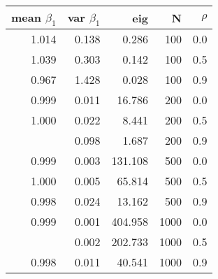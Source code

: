 
\begin{tabular}{rrrrr}
\toprule
mean $\beta_1$ & var $\beta_1$ & eig & N & $\rho$\\
\midrule
1.014 & 0.138 & 0.286 & 100 & 0.0\\
1.039 & 0.303 & 0.142 & 100 & 0.5\\
0.967 & 1.428 & 0.028 & 100 & 0.9\\
0.999 & 0.011 & 16.786 & 200 & 0.0\\
1.000 & 0.022 & 8.441 & 200 & 0.5\\
\addlinespace
0.995 & 0.098 & 1.687 & 200 & 0.9\\
0.999 & 0.003 & 131.108 & 500 & 0.0\\
1.000 & 0.005 & 65.814 & 500 & 0.5\\
0.998 & 0.024 & 13.162 & 500 & 0.9\\
0.999 & 0.001 & 404.958 & 1000 & 0.0\\
\addlinespace
1.001 & 0.002 & 202.733 & 1000 & 0.5\\
0.998 & 0.011 & 40.541 & 1000 & 0.9\\
\bottomrule
\end{tabular}
